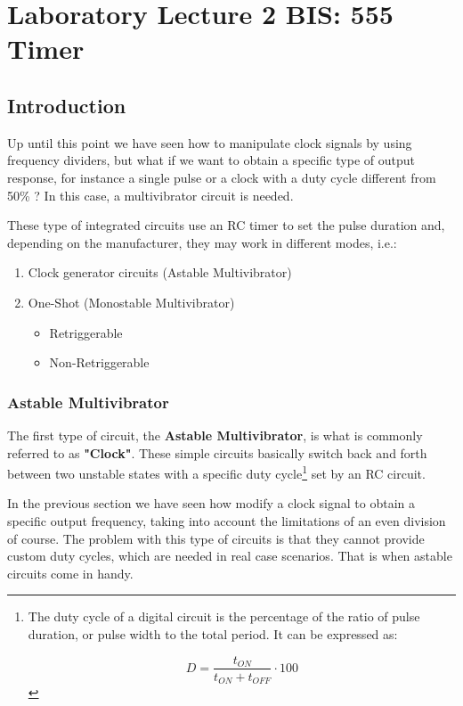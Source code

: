 \section{Laboratory Lecture 2 BIS: 555 Timer}

\subsection{Introduction}

Up until this point we have seen how to manipulate clock signals by using frequency dividers, but what if we want to obtain a specific type of output response, for instance a single pulse or a clock with a duty cycle different from 50\% ? In this case, a multivibrator circuit is needed. \medskip

These type of integrated circuits use an RC timer to set the pulse duration and, depending on the manufacturer, they may work in different modes, i.e.:

\begin{enumerate}
    \item Clock generator circuits (Astable Multivibrator)
    
    \item One-Shot (Monostable Multivibrator)
    \begin{itemize}
        \item Retriggerable
        \item Non-Retriggerable
    \end{itemize}
\end{enumerate}

\subsubsection{Astable Multivibrator}

The first type of circuit, the \textbf{Astable Multivibrator}, is what is commonly referred to as \textbf{"Clock"}. These simple circuits basically switch back and forth between two unstable states with a specific duty cycle\footnote{The duty cycle of a digital circuit is the percentage of the ratio of pulse duration, or pulse width to the total period. It can be expressed as: 

\begin{equation*}
    D = \frac{t_{ON}}{t_{ON} + t_{OFF}} \cdot 100
    \label{fig:DUTY}
\end{equation*}
} set by an RC circuit. \medskip

In the previous section we have seen how modify a clock signal to obtain a specific output frequency, taking into account the limitations of an even division of course. The problem with this type of circuits is that they cannot provide custom duty cycles, which are needed in real case scenarios. That is when astable circuits come in handy.\medskip

